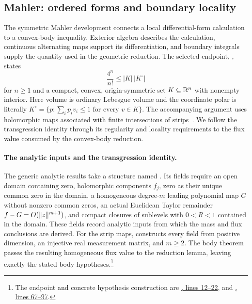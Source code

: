 \subsection{Mahler: ordered forms and boundary locality}
\label{sec:mahler}

The symmetric Mahler development connects a local differential-form calculation to a convex-body inequality. Exterior algebra describes the calculation, continuous alternating maps support its differentiation, and boundary integrals supply the quantity used in the geometric reduction. The selected endpoint, , states
\[
  \frac{4^n}{n!}\leq |K|\,|K^\circ|
\]
for $n\geq1$ and a compact, convex, origin-symmetric set
$K\subseteq\mathbb R^n$ with nonempty interior. Here volume is ordinary Lebesgue
volume and the coordinate polar is literally
$K^\circ=\{p:\sum_i p_i v_i\leq1\text{ for every }v\in K\}$.
The accompanying argument uses holomorphic maps associated with finite intersections of strips~\citep{OAIMahler}. We follow the transgression identity through its regularity and locality requirements to the flux value consumed by the convex-body reduction.

\paragraph{The analytic inputs and the transgression identity.}
The generic analytic results take a structure named .
Its fields require an open domain containing zero, holomorphic components
$f_j$, zero as their unique common zero in the domain, a homogeneous degree-$m$ leading
polynomial map $G$ without nonzero common zeros, an actual Euclidean Taylor
remainder $f-G=O(\lVert z\rVert^{m+1})$, and compact closures of sublevels
with $0<R<1$ contained in the domain.
These fields record analytic inputs from which the mass and flux conclusions are derived. For the strip maps,
 constructs every field from positive
dimension, an injective real measurement matrix, and $m\geq2$.
The body theorem passes the resulting homogeneous flux value to the reduction lemma, leaving exactly the stated body hypotheses.\footnote{The endpoint and concrete hypothesis
construction are
\href{https://github.com/openai/math/blob/fd4aeeb2ee4fc729c18d98444fed42fd0529eeeb/lean/OAI/Analysis/Mahler/MainTheorem.lean\#L12-L22}{, lines 12--22}, and
\href{https://github.com/openai/math/blob/fd4aeeb2ee4fc729c18d98444fed42fd0529eeeb/lean/OAI/Analysis/Mahler/EuclideanSpecialMap.lean\#L67-L97}{, lines 67--97}.}

